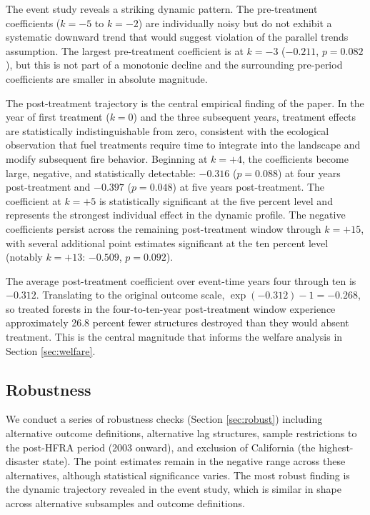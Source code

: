 \documentclass[12pt, letterpaper]{article}
\begin{document}
The event study reveals a striking dynamic pattern. The pre-treatment coefficients ($k = -5$ to $k = -2$) are individually noisy but do not exhibit a systematic downward trend that would suggest violation of the parallel trends assumption. The largest pre-treatment coefficient is at $k = -3$ ($-0.211$, $p = 0.082$), but this is not part of a monotonic decline and the surrounding pre-period coefficients are smaller in absolute magnitude.

The post-treatment trajectory is the central empirical finding of the paper. In the year of first treatment ($k = 0$) and the three subsequent years, treatment effects are statistically indistinguishable from zero, consistent with the ecological observation that fuel treatments require time to integrate into the landscape and modify subsequent fire behavior. Beginning at $k = +4$, the coefficients become large, negative, and statistically detectable: $-0.316$ ($p = 0.088$) at four years post-treatment and $-0.397$ ($p = 0.048$) at five years post-treatment. The coefficient at $k = +5$ is statistically significant at the five percent level and represents the strongest individual effect in the dynamic profile. The negative coefficients persist across the remaining post-treatment window through $k = +15$, with several additional point estimates significant at the ten percent level (notably $k = +13$: $-0.509$, $p = 0.092$).

The average post-treatment coefficient over event-time years four through ten is $-0.312$. Translating to the original outcome scale, $\exp(-0.312) - 1 = -0.268$, so treated forests in the four-to-ten-year post-treatment window experience approximately 26.8 percent fewer structures destroyed than they would absent treatment. This is the central magnitude that informs the welfare analysis in Section \ref{sec:welfare}.

\subsection{Robustness}

We conduct a series of robustness checks (Section \ref{sec:robust}) including alternative outcome definitions, alternative lag structures, sample restrictions to the post-HFRA period (2003 onward), and exclusion of California (the highest-disaster state). The point estimates remain in the negative range across these alternatives, although statistical significance varies. The most robust finding is the dynamic trajectory revealed in the event study, which is similar in shape across alternative subsamples and outcome definitions.
\end{document}
